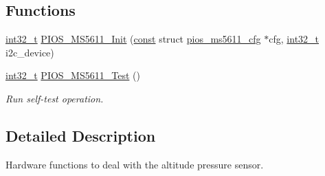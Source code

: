 \subsection*{Functions}
\begin{DoxyCompactItemize}
\item 
\hyperlink{group___n_a_m_e_gafd12020da5a235dfcf0c3c748fb5baed}{int32\-\_\-t} \hyperlink{group___p_i_o_s___m_s5611_ga31828cf8d806bc616c063b785165ede1}{P\-I\-O\-S\-\_\-\-M\-S5611\-\_\-\-Init} (\hyperlink{group___n_a_m_e_ga7ae6d0e43244213b34de2c2b9aa30da6}{const} struct \hyperlink{structpios__ms5611__cfg}{pios\-\_\-ms5611\-\_\-cfg} $\ast$cfg, \hyperlink{group___n_a_m_e_gafd12020da5a235dfcf0c3c748fb5baed}{int32\-\_\-t} i2c\-\_\-device)
\item 
\hyperlink{group___n_a_m_e_gafd12020da5a235dfcf0c3c748fb5baed}{int32\-\_\-t} \hyperlink{group___p_i_o_s___m_s5611_ga46e5e2cff722dd4031da3bf1603afda2}{P\-I\-O\-S\-\_\-\-M\-S5611\-\_\-\-Test} ()
\begin{DoxyCompactList}\small\item\em Run self-\/test operation. \end{DoxyCompactList}\end{DoxyCompactItemize}


\subsection{Detailed Description}
Hardware functions to deal with the altitude pressure sensor. 

